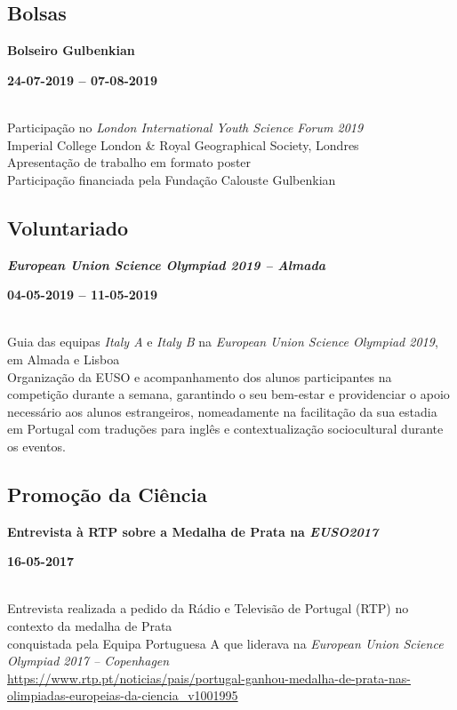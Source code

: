 \documentclass[8pt]{extarticle}
\newcommand{\parag}[1]{
\begin{minipage}{\textwidth} \hfill
\begin{minipage}{\dimexpr\textwidth-0.6cm}
	#1
\end{minipage}
\end{minipage}
}
\newcommand{\itemtime}[2]{
#1 \hfill \begin{minipage}[t]{0.185\textwidth}         #2  \end{minipage}
}
\newcommand{\job}[3]{\parag{
\itemtime{\textbf{#1}}{\textbf{#2}}\\
#3 \vspace*{9px}}}
\begin{document}
\subsection*{Bolsas}
\job{Bolseiro Gulbenkian}{24-07-2019 – 07-08-2019}{
Participação no \textit{London International Youth Science Forum 2019}\\
Imperial College London \& Royal Geographical Society, Londres\\
Apresentação de trabalho em formato poster\\
Participação financiada pela Fundação Calouste Gulbenkian
}
\subsection*{Voluntariado}
\job{\textit{European Union Science Olympiad 2019 – Almada}}{04-05-2019 – 11-05-2019}{
Guia das equipas \textit{Italy A} e \textit{Italy B} na \textit{European Union Science Olympiad 2019}, em Almada e Lisboa\\
Organização da EUSO e acompanhamento dos alunos participantes na competição durante a semana, garantindo o seu bem-estar e providenciar o apoio necessário aos alunos estrangeiros, nomeadamente na facilitação da sua estadia em Portugal com traduções para inglês e contextualização sociocultural durante os eventos.
}
\subsection*{Promoção da Ciência}
\job{Entrevista à RTP sobre a Medalha de Prata na \textit{EUSO2017}}{16-05-2017}{
Entrevista realizada a pedido da Rádio e Televisão de Portugal (RTP) no contexto da medalha de Prata\\
conquistada pela Equipa Portuguesa A que liderava na \textit{European Union Science Olympiad 2017 – Copenhagen}\\
\url{https://www.rtp.pt/noticias/pais/portugal-ganhou-medalha-de-prata-nas-olimpiadas-europeias-da-ciencia_v1001995}
}
\end{document}
